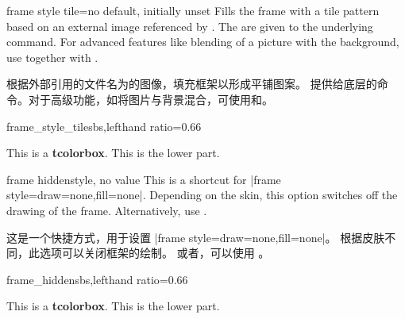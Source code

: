\begin{docTcbKey}{frame style tile}{=}{no default, initially unset}
Fills the frame with a tile pattern based on an external image referenced by .
The  are given to the underlying  command.
For advanced features like blending of a picture with the background,
use  together with .

根据外部引用的文件名为的图像，填充框架以形成平铺图案。 提供给底层的命令。对于高级功能，如将图片与背景混合，可使用和。
\begin{exdispExample*}{frame_style_tile}{sbs,lefthand ratio=0.66}

\begin{tcolorbox}[enhanced,title=My title,
  frame style tile={width=1cm}{pink_marble.png}]
This is a \textbf{tcolorbox}.
\tcblower
This is the lower part.
\end{tcolorbox}
\end{exdispExample*}
\end{docTcbKey}

\begin{docTcbKey}{frame hidden}{}{style, no value}
This is a shortcut for |frame style={draw=none,fill=none}|.
Depending on the skin, this option switches off the drawing of the
frame.
Alternatively, use .

这是一个快捷方式，用于设置 |frame style={draw=none,fill=none}|。 根据皮肤不同，此选项可以关闭框架的绘制。 或者，可以使用 。
\begin{exdispExample*}{frame_hidden}{sbs,lefthand ratio=0.66}

\begin{tcolorbox}[enhanced,title=My title,
frame hidden]
This is a \textbf{tcolorbox}.
\tcblower
This is the lower part.
\end{tcolorbox}
\end{exdispExample*}
\end{docTcbKey}


